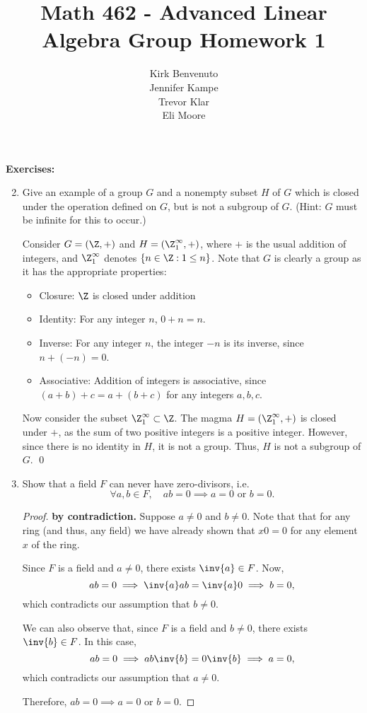 \documentclass[letterpaper]{article}
\title{Math 462 - Advanced Linear Algebra \linebreak
	Group Homework 1}
\author{Kirk Benvenuto\\Jennifer Kampe\\Trevor Klar\\Eli Moore}
\begin{document}
\maketitle

\noindent \textbf{Exercises:}
\begin{enumerate}
\setcounter{enumi}{1}
\item Give an example of a group $G$ and a nonempty subset $H$ of $G$ which is closed under the operation defined on $G$, but is not a subgroup of $G$. (Hint:
$G$ must be infinite for this to occur.) 
\begin{example*}
Consider $G=(\Z,+)$ and $H=(\Z_1^\infty,+)$, where $+$ is the usual addition of integers, and $\Z_1^\infty$ denotes $\{n \in \Z: 1 \leq n\}$. Note that $G$ is clearly a group as it has the appropriate properties:
\begin{itemize}
\item Closure: $\Z$ is closed under addition
\item Identity: For any integer $n$, $0+n=n$. 
\item Inverse: For any integer $n$, the integer $-n$ is its inverse, since $n+(-n)=0$. 
\item Associative: Addition of integers is associative, since $(a+b)+c=a+(b+c)$ for any integers $a,b,c$. 
\end{itemize}

Now consider the subset $\Z_1^\infty \subset \Z$. The magma $H=(\Z_1^\infty,+)$ is closed under $+$, as the sum of two positive integers is a positive integer. However, since there is no identity in $H$, it is not a group. Thus, $H$ is not a subgroup of $G$. \qed
\end{example*}

\setcounter{enumi}{21}
\item Show that a field $F$ can never have zero-divisors, i.e. $$\forall a,b \in F, \quad ab=0 \implies a=0\text{ or }b=0.$$
\begin{proof}\textbf{by contradiction.} Suppose $a \neq 0$ and $b\neq0$. Note that that for any ring (and thus, any field) we have already shown that $x0=0$ for any element $x$ of the ring. 

Since $F$ is a field and $a\neq 0$, there exists $\inv{a} \in F$. Now, 
$$ab=0 \implies \inv{a}ab=\inv{a}0 \implies b = 0,$$
which contradicts our assumption that $b \neq 0$.

We can also observe that, since $F$ is a field and $b\neq 0$, there exists $\inv{b} \in F$. In this case, 
$$ab=0 \implies ab\inv{b}=0\inv{b} \implies a = 0,$$
which contradicts our assumption that $a \neq 0$.

Therefore, $ab=0 \implies a=0\text{ or }b=0$.
\end{proof}

\end{enumerate}
\end{document}
